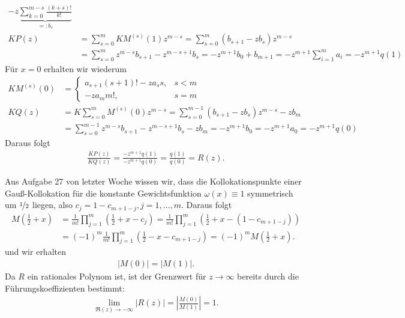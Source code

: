 \begin{solution}
\begin{align*}
  - z\underbrace{\sum_{k=0}^{m-s}\frac{(k+s)!}{k!}}_{=: b_s} \\
  KP(z) &= \sum_{s=0}^m KM^{(s)}(1)z^{m-s} = \sum_{s=0}^m (b_{s+1} - zb_s)z^{m-s} \\
  &= \sum_{s=0}^m z^{m-s}b_{s+1} - z^{m-s+1}b_s
  = -z^{m+1}b_0 + b_{m+1}
  = -z^{m+1}\sum_{i=1}^m a_i
  = -z^{m+1}q(1)
\end{align*}
Für $x=0$ erhalten wir wiederum
\begin{align*}
  KM^{(s)}(0) &= \begin{cases}
    a_{s+1}(s+1)! - za_ss, & s < m \\
    -za_mm!, & s = m
  \end{cases} \\
  KQ(z) &= K\sum_{s=0}^m M^{(s)}(0)z^{m-s} = \sum_{s=0}^{m-1}(b_{s+1}-zb_s)z^{m-s} - zb_m \\
  &= \sum_{s=0}^{m-1}z^{m-s}b_{s+1} - z^{m-s+1}b_s - zb_m
  = -z^{m+1}b_0
  = -z^{m+1}a_0
  = -z^{m+1}q(0)
\end{align*}
Daraus folgt
\begin{align*}
  \frac{KP(z)}{KQ(z)} = \frac{-z^{m+1}q(1)}{-z^{m+1}q(0)} = \frac{q(1)}{q(0)} = R(z).
\end{align*}
\item
Aus Aufgabe 27 von letzter Woche wissen wir, dass die Kollokationspunkte einer
Gauß-Kollokation für die konstante Gewichtsfunktion $\omega(x) \equiv 1$
symmetrisch um $\nicefrac{1}{2}$ liegen, also $c_j = 1 - c_{m+1-j}, j = 1,\dots,m$.
Daraus folgt
\begin{align*}
  M\left(\frac{1}{2}+x\right) &= \frac{1}{m!}\prod_{j=1}^m\left(\frac{1}{2}+x-c_j\right)
  = \frac{1}{m!}\prod_{j=1}^m\left(\frac{1}{2}+x - (1 - c_{m+1-j})\right) \\
  &= (-1)^m\frac{1}{m!}\prod_{j=1}^m\left(\frac{1}{2} - x - c_{m+1-j}\right)
  = (-1)^m M\left(\frac{1}{2}+x\right).
\end{align*}
und wir erhalten
\begin{align*}
  |M(0)| = |M(1)|.
\end{align*}
Da $R$ ein rationales Polynom ist, ist der Grenzwert für $z \rightarrow \infty$
bereits durch die Führungskoeffizienten bestimmt:
\begin{align*}
  \lim_{\Re(z) \rightarrow -\infty} |R(z)| = \left|\frac{M(0)}{M(1)}\right| = 1.
\end{align*}
\end{solution}
